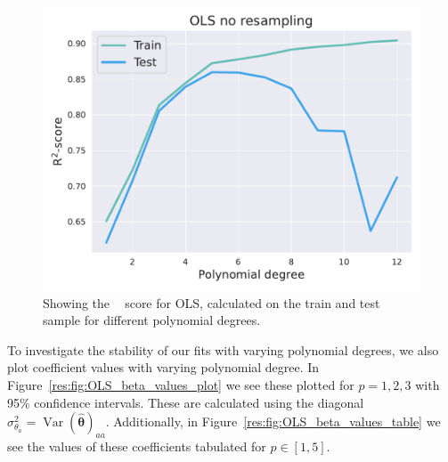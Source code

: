 \documentclass[twocolumn,english,notitlepage]{article}
\renewcommand{\vec}[1]{\boldsymbol{#1}}
\renewcommand{\var}{\operatorname{Var}}
\DeclareMathOperator{\Rsquared}{R^2}
\begin{document}
                \begin{figure}[ht]
                    \centering
                    \includegraphics[width=.9\linewidth]{OLS_r2_noresample.pdf}
                    \caption{Showing the $\Rsquared$ score for OLS, calculated on the train and test sample for different polynomial degrees.}
                    \label{res:fig:OLS_R2_noresample}
                \end{figure}

                To investigate the stability of our fits with varying polynomial degrees, we also plot coefficient values with varying polynomial degree. In Figure~\ref{res:fig:OLS_beta_values_plot} we see these plotted for $p = 1,2,3$ with 95\% confidence intervals. These are calculated using the diagonal $\sigma^2_{\theta_a} = \var{(\vec{\hat{\theta}})_{aa}}$. Additionally, in Figure~\ref{res:fig:OLS_beta_values_table} we see the values of these coefficients tabulated for $p \in [1,5]$.
\end{document}
